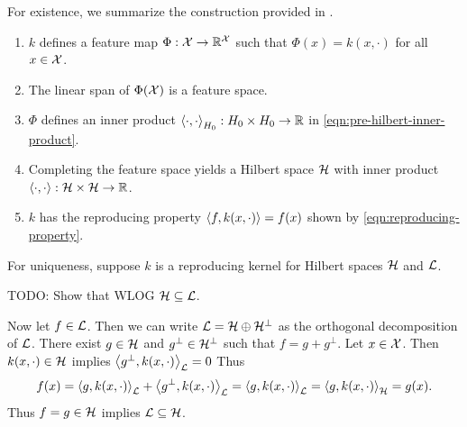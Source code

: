 For existence, we summarize the construction provided in .
\begin{enumerate}
    \item \(k\) defines a feature map \(\Phi : \mathcal{X} \to \mathbb{R}^{\mathcal{X}}\) such that \(\Phi(x) = k(x, \cdot)\) for all \(x \in \mathcal{X}\).
    \item The linear span of \(\Phi(\mathcal{X})\) is a feature space.
    \item \(\Phi\) defines an inner product \(\left\langle \cdot, \cdot \right\rangle_{H_0} : H_0 \times H_0 \to \mathbb{R}\) in \cref{eqn:pre-hilbert-inner-product}.
    \item Completing the feature space yields a Hilbert space \(\mathcal{H}\) with inner product \(\left\langle \cdot, \cdot \right\rangle : \mathcal{H} \times \mathcal{H} \to \mathbb{R}\).
    \item \(k\) has the reproducing property \(\left\langle f, k(x,\cdot) \right\rangle = f(x)\) shown by \cref{eqn:reproducing-property}.
\end{enumerate}
\def\L{\hilbert{L}}
\def\Hp{\H^{\perp}}
For uniqueness, suppose \(k\) is a reproducing kernel for Hilbert spaces \(\mathcal{H}\) and \(\L\).

TODO: Show that WLOG \(\H \subseteq \L\).

Now let \(f \in \L\).
Then we can write \(\L = \H \oplus \Hp\) as the orthogonal decomposition of \(\L\).
There exist \(g \in \mathcal{H}\) and \(g^\perp \in \Hp\) such that \(f = g + g^\perp\).
Let \(x \in \mathcal{X}\).
Then \(k(x,\cdot) \in \mathcal{H}\) implies \(\ipt{g^\perp,k(x,\cdot)}_{\L} = 0\)
Thus
\begin{equation}
    f(x)
    = \ipt{g,k(x,\cdot)}_{\L} + \ipt{g^\perp,k(x,\cdot)}_{\L}
    = \ipt{g,k(x,\cdot)}_{\L}
    = \ipt{g,k(x,\cdot)}_{\H}
    = g(x).
\end{equation}
Thus \(f = g \in \mathcal{H}\) implies \(\L \subseteq \H\).